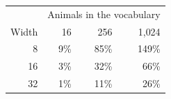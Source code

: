 \begin{tabular}{@{}rrrr@{}}
\toprule
 & \multicolumn{3}{c}{Animals in the vocabulary} \\
Width & 16 & 256 & 1{,}024 \\
\midrule
8 & 9\% & 85\% & 149\% \\
16 & 3\% & 32\% & 66\% \\
32 & 1\% & 11\% & 26\% \\
\bottomrule
\end{tabular}
